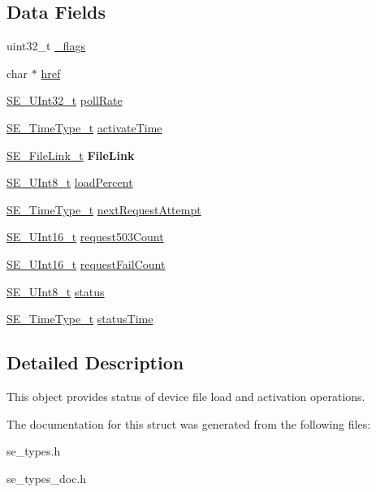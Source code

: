 \subsection*{Data Fields}
\begin{DoxyCompactItemize}
\item 
uint32\+\_\+t \hyperlink{group__FileStatus_ga4b3b27fbcfaf0fc19ac6bd5d54afd811}{\+\_\+flags}
\item 
char $\ast$ \hyperlink{group__FileStatus_gab42569063c0f1f2ecbacadf94a84692b}{href}
\item 
\hyperlink{group__UInt32_ga70bd4ecda3c0c85d20779d685a270cdb}{S\+E\+\_\+\+U\+Int32\+\_\+t} \hyperlink{group__FileStatus_ga84d473efe80699dab7000ebf8e072f81}{poll\+Rate}
\item 
\hyperlink{group__TimeType_ga6fba87a5b57829b4ff3f0e7638156682}{S\+E\+\_\+\+Time\+Type\+\_\+t} \hyperlink{group__FileStatus_gaf741987e3e6783c64bf119b24dde669f}{activate\+Time}
\item 
\hyperlink{structSE__FileLink__t}{S\+E\+\_\+\+File\+Link\+\_\+t} {\bfseries File\+Link}
\item 
\hyperlink{group__UInt8_gaf7c365a1acfe204e3a67c16ed44572f5}{S\+E\+\_\+\+U\+Int8\+\_\+t} \hyperlink{group__FileStatus_ga10c95c145e19e06b777320bf0a2dd354}{load\+Percent}
\item 
\hyperlink{group__TimeType_ga6fba87a5b57829b4ff3f0e7638156682}{S\+E\+\_\+\+Time\+Type\+\_\+t} \hyperlink{group__FileStatus_gace8c5876bbb1939bc810eba9c41485a8}{next\+Request\+Attempt}
\item 
\hyperlink{group__UInt16_gac68d541f189538bfd30cfaa712d20d29}{S\+E\+\_\+\+U\+Int16\+\_\+t} \hyperlink{group__FileStatus_gaac513ab0b825a0ca8dc8781afbd86fea}{request503\+Count}
\item 
\hyperlink{group__UInt16_gac68d541f189538bfd30cfaa712d20d29}{S\+E\+\_\+\+U\+Int16\+\_\+t} \hyperlink{group__FileStatus_ga225fff3f05549ecacea2c1f2ce1b4776}{request\+Fail\+Count}
\item 
\hyperlink{group__UInt8_gaf7c365a1acfe204e3a67c16ed44572f5}{S\+E\+\_\+\+U\+Int8\+\_\+t} \hyperlink{group__FileStatus_ga5ec878ed781a4fa3d9a7530017df562a}{status}
\item 
\hyperlink{group__TimeType_ga6fba87a5b57829b4ff3f0e7638156682}{S\+E\+\_\+\+Time\+Type\+\_\+t} \hyperlink{group__FileStatus_ga07bc76971f8a0f26f8e5b1c62e6432e6}{status\+Time}
\end{DoxyCompactItemize}


\subsection{Detailed Description}
This object provides status of device file load and activation operations. 

The documentation for this struct was generated from the following files\+:\begin{DoxyCompactItemize}
\item 
se\+\_\+types.\+h\item 
se\+\_\+types\+\_\+doc.\+h\end{DoxyCompactItemize}
